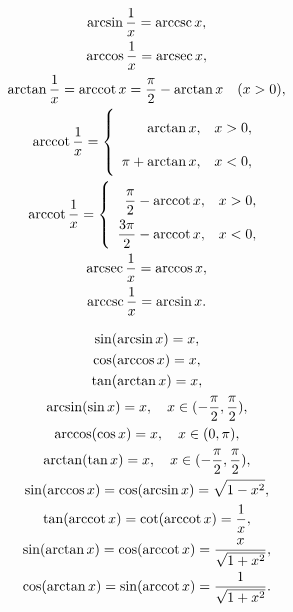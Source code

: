 \begin{theorem}[倒数关系]
\begin{gather}
	\arcsin\frac{1}{x} = \arccsc x, \\
	\arccos\frac{1}{x} = \arcsec x, \\
	\arctan\frac{1}{x} = \arccot x
		= \frac{\pi}{2} - \arctan x
	\quad(x>0), \\
	\arccot\frac{1}{x} = \left\{ \begin{array}{rl}
		\arctan x, & x>0, \\
		\pi+\arctan x, & x<0,
	\end{array} \right. \\
	\arccot\frac{1}{x} = \left\{ \def\arraystretch{2} \begin{array}{rc}
		\dfrac{\pi}{2} - \arccot x, & x>0, \\
		\dfrac{3\pi}{2} - \arccot x, & x<0,
		\end{array} \right. \\
	\arcsec\frac{1}{x} = \arccos x, \\
	\arccsc\frac{1}{x} = \arcsin x.
\end{gather}
\end{theorem}

\begin{theorem}[三角关系]
\begin{gather}
	\sin(\arcsin{x}) = x, \\
	\cos(\arccos{x}) = x, \\
	\tan(\arctan{x}) = x, \\
	\arcsin(\sin x) = x, \quad x \in (-\frac{\pi}{2},\frac{\pi}{2}), \\
	\arccos(\cos x) = x, \quad x \in (0,\pi), \\
	\arctan(\tan x) = x, \quad x \in (-\frac{\pi}{2},\frac{\pi}{2}), \\
	\sin(\arccos{x}) = \cos(\arcsin{x}) = \sqrt{1 - x^2}, \\
	\tan(\arccot{x}) = \cot(\arccot{x}) = \frac{1}{x}, \\
	\sin(\arctan{x}) = \cos(\arccot{x}) = \frac{x}{\sqrt{1+x^2}}, \\
	\cos(\arctan{x}) = \sin(\arccot{x}) = \frac{1}{\sqrt{1+x^2}}.
\end{gather}
\end{theorem}

